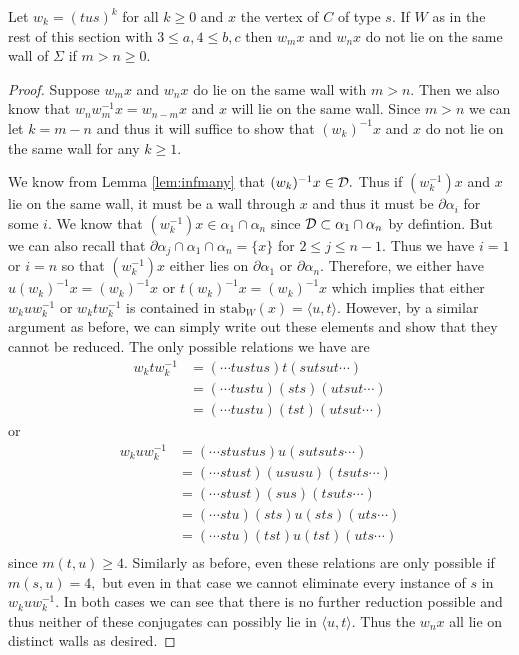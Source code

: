 \documentclass[class=book, crop=false,12 pt]{standalone}
\begin{document}
\begin{lemma}
	\label{lem:samewall}
	Let $w_k=(tus)^k$ for all $k\ge 0$ and $x$ the vertex of $C$ of type $s.$ If $W$ as in the rest of this section with $3\le a,4\le b,c$ then $w_mx$ and $w_nx$ do not lie on the same wall of $\Sigma$ if $m>n\ge 0.$
\end{lemma}
\begin{proof}
	Suppose $w_mx$ and $w_nx$ do lie on the same wall with $m>n.$ Then we also know that $w_nw^{-1}_mx=w_{n-m}x$ and $x$ will lie on the same wall. Since $m>n$ we can let $k=m-n$ and thus it will suffice to show that $(w_k)^{-1}x$ and $x$ do not lie on the same wall for any $k\ge 1.$
	
We know from Lemma \ref{lem:infmany} that $(w_k)^{-1}x\in \mathcal{D}.$ Thus if $(w_k^{-1})x$ and $x$ lie on the same wall, it must be a wall through $x$ and thus it must be $\partial\alpha_i$ for some $i.$ We know that $(w_k^{-1})x\in \alpha_1\cap \alpha_n$ since $\mathcal{D}\subset \alpha_1\cap \alpha_n$ by defintion. But we can also recall that $\partial\alpha_j\cap \alpha_1\cap \alpha_n=\{x\}$ for $2\le j\le n-1.$ Thus we have $i=1$ or $i=n$ so that $(w_k^{-1})x$ either lies on $\partial\alpha_1$ or $\partial\alpha_n.$  Therefore, we either have $u(w_k)^{-1}x=(w_k)^{-1}x$ or $t(w_k)^{-1}x=(w_k)^{-1}x$ which implies that either $w_kuw_k^{-1}$ or $w_ktw_k^{-1}$ is contained in $\mathrm{stab}_W(x)=\langle u,t \rangle.$ However, by a similar argument as before, we can simply write out these elements and show that they cannot be reduced. The only possible relations we have are
\begin{align*}
	w_ktw_k^{-1}&=(\cdots tustus)t(sutsut\cdots)\\
		    &=(\cdots tustu)(sts)(utsut\cdots)\\
		    &=(\cdots tustu)(tst)(utsut\cdots)
\end{align*}
or
\begin{align*}
	w_kuw_k^{-1}&=(\cdots stustus)u(sutsuts\cdots)\\
		    &=(\cdots stust)(ususu)(tsuts\cdots)\\
		    &=(\cdots stust)(sus)(tsuts\cdots)\\
		    &=(\cdots stu)(sts)u(sts)(uts\cdots)\\
		    &=(\cdots stu)(tst)u(tst)(uts\cdots)\\
\end{align*}
since $m(t,u)\ge 4.$ Similarly as before, even these relations are only possible if $m(s,u)=4,$ but even in that case we cannot eliminate every instance of $s$ in $w_kuw_k^{-1}.$ In both cases we can see that there is no further reduction possible and thus neither of these conjugates can possibly lie in $\langle u,t \rangle.$ Thus the $w_nx$ all lie on distinct walls as desired.
\end{proof}
\end{document}
